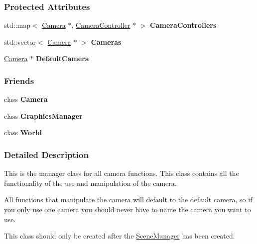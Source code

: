 \subsubsection*{Protected Attributes}
\begin{DoxyCompactItemize}
\item 
\hypertarget{classMezzanine_1_1CameraManager_a77e86d6a48fe53284be6805c4c8ac8bc}{
std::map$<$ \hyperlink{classMezzanine_1_1Camera}{Camera} $\ast$, \hyperlink{classMezzanine_1_1CameraController}{CameraController} $\ast$ $>$ {\bfseries CameraControllers}}
\label{classMezzanine_1_1CameraManager_a77e86d6a48fe53284be6805c4c8ac8bc}

\item 
\hypertarget{classMezzanine_1_1CameraManager_ad96fededfedccc6019801f0b99931829}{
std::vector$<$ \hyperlink{classMezzanine_1_1Camera}{Camera} $\ast$ $>$ {\bfseries Cameras}}
\label{classMezzanine_1_1CameraManager_ad96fededfedccc6019801f0b99931829}

\item 
\hypertarget{classMezzanine_1_1CameraManager_a3d777350cf282899968ab7a83f76b3ec}{
\hyperlink{classMezzanine_1_1Camera}{Camera} $\ast$ {\bfseries DefaultCamera}}
\label{classMezzanine_1_1CameraManager_a3d777350cf282899968ab7a83f76b3ec}

\end{DoxyCompactItemize}
\subsubsection*{Friends}
\begin{DoxyCompactItemize}
\item 
\hypertarget{classMezzanine_1_1CameraManager_ad8bd9afbbd7af19d996da80e9d25890d}{
class {\bfseries Camera}}
\label{classMezzanine_1_1CameraManager_ad8bd9afbbd7af19d996da80e9d25890d}

\item 
\hypertarget{classMezzanine_1_1CameraManager_ad65eae853be6e1a35bf85e6865583560}{
class {\bfseries GraphicsManager}}
\label{classMezzanine_1_1CameraManager_ad65eae853be6e1a35bf85e6865583560}

\item 
\hypertarget{classMezzanine_1_1CameraManager_a7b4bcdf992c21ae83363f25df05b1d25}{
class {\bfseries World}}
\label{classMezzanine_1_1CameraManager_a7b4bcdf992c21ae83363f25df05b1d25}

\end{DoxyCompactItemize}


\subsubsection{Detailed Description}
This is the manager class for all camera functions. This class contains all the functionality of the use and manipulation of the camera. \par
 All functions that manipulate the camera will default to the default camera, so if you only use one camera you should never have to name the camera you want to use. \par
 This class should only be created after the \hyperlink{classMezzanine_1_1SceneManager}{SceneManager} has been created. 

